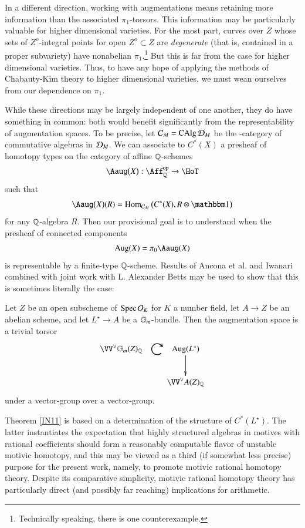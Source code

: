 In a different direction, working with augmentations means retaining more information than the associated $\pi_1$-torsors. This information may be particularly valuable for higher dimensional varieties. For the most part, curves over $Z$ whose sets of $Z^o$-integral points for open $Z^o \subset Z$ are \emph{degenerate} (that is, contained in a proper subvariety) have nonabelian $\pi_1$.\footnote{Technically speaking, there is one counterexample.} But this is far from the case for higher dimensional varieties. Thus, to have any hope of applying the methods of Chabauty-Kim theory to higher dimensional varieties, we must wean ourselves from our dependence on $\pi_1$. 

While these directions may be largely independent of one another, they do have something in common: both would benefit significantly from the representability of augmentation spaces. To be precise, let $\mathcal{C}_M = \operatorname{CAlg} \mathcal{D}_M$ be the \oo-category of commutative algebras in $\mathcal{D}_M$. We can associate to $C^*(X)$ a presheaf of homotopy types on the category of affine $\mathbb{Q}$-schemes
\[
\Aaug \big( X \big):
\Aff_\QQ\op
\to
\HoT
\]
such that
\[
\Aaug \big( X \big)(R) = 
\Hom_{\Cc_M} \big( C^*(X), R \otimes \one \big)
\]
for any $\mathbb{Q}$-algebra $R$. Then our provisional goal is to understand when the presheaf of connected components
\[
\Aug(X) = \pi_0 \Aaug(X)
\]
is representable by a finite-type $\mathbb{Q}$-scheme. Results of Ancona et al. \cite{AnconaHuberII} and Iwanari \cite{Iwanari} combined with joint work with L. Alexander Betts \cite[Theorem 7.2]{DCBetts} may be used to show that this is sometimes literally the case:

\begin{ssTheorem}
\label{IN11}
Let $Z$ be an open subscheme of $\operatorname{Spec} \mathcal{O}_K$ for $K$ a number field, let $A \to Z$ be an abelian scheme, and let $L^\star \to A$ be a ${\mathbb{G}_m}$-bundle. Then the augmentation space is a trivial torsor
\[
\xymatrix{
\VV^\lor \Gm(Z)_\QQ
\ar@{}[r]|-{\rotatebox{-90}{\scalebox{2}{$\circlearrowright$}}}
&
\Aug(L^*) \ar[d]
\\
& \VV^\lor A(Z)_\QQ
}
\]
under a vector-group over a vector-group.
\end{ssTheorem}

\noindent
Theorem \ref{IN11} is based on a determination of the structure of $C^*(L^\star)$. The latter instantiates the expectation that highly structured algebras in motives with rational coefficients should form a reasonably computable flavor of unstable motivic homotopy, and this may be viewed as a third (if somewhat less precise) purpose for the present work, namely, to promote motivic rational homotopy theory. Despite its comparative simplicity, motivic rational homotopy theory has particularly direct (and possibly far reaching) implications for arithmetic. 

